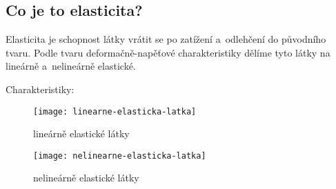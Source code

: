 
\subsection{Co je to elasticita?}
Elasticita je schopnost látky vrátit se po zatížení a~odlehčení do původního tvaru.
Podle tvaru deformačně-napěťové charakteristiky dělíme tyto látky na lineárně a~nelineárně elastické.

Charakteristiky:
\begin{figure}[H]
	\label{fig:linearne-elasticka-latka}
	\centering
	\texttt{[image: linearne-elasticka-latka]}
	\caption{lineárně elastické látky}
\end{figure}

\begin{figure}[H]
	\label{fig:nelinearne-elasticka-latka}
	\centering
	\texttt{[image: nelinearne-elasticka-latka]}
	\caption{nelineárně elastické látky}
\end{figure}
